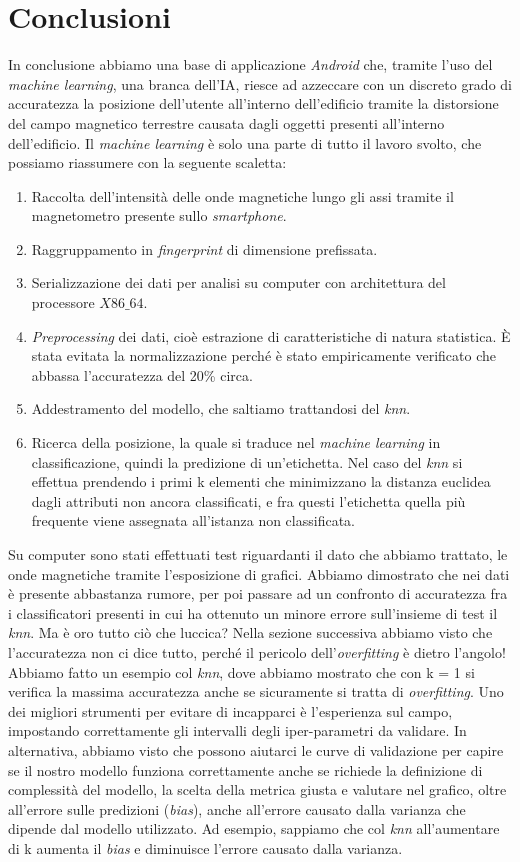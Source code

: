 \section{Conclusioni}
In conclusione abbiamo una base di applicazione \textit{Android} che, tramite l'uso del \textit{machine learning}, una branca dell'IA, riesce ad azzeccare con un discreto grado di accuratezza la posizione dell'utente all'interno dell'edificio tramite la distorsione del campo magnetico terrestre causata dagli oggetti presenti all'interno dell'edificio. Il \textit{machine learning} \`e solo una parte di tutto il lavoro svolto, che possiamo riassumere con la seguente scaletta:
\begin{enumerate}
	\item Raccolta dell'intensit\`a delle onde magnetiche lungo gli assi tramite il magnetometro presente sullo \textit{smartphone}.
	\item Raggruppamento in \textit{fingerprint} di dimensione prefissata.
	\item Serializzazione dei dati per analisi su computer con architettura del processore $X86\_64$.
	\item \textit{Preprocessing} dei dati, cio\`e  estrazione di caratteristiche di natura statistica. \`E stata evitata la normalizzazione perch\'e \`e stato empiricamente verificato che abbassa l'accuratezza del 20\% circa.
	\item Addestramento del modello, che saltiamo trattandosi del \textit{knn}.
	\item Ricerca della posizione, la quale si traduce nel \textit{machine learning} in classificazione, quindi la predizione di un'etichetta. Nel caso del \textit{knn} si effettua prendendo i primi k elementi che minimizzano la distanza euclidea dagli attributi non ancora classificati, e fra questi l'etichetta quella pi\`u frequente viene assegnata all'istanza non classificata.
\end{enumerate}
Su computer sono stati effettuati test riguardanti il dato che abbiamo trattato, le onde magnetiche tramite l'esposizione di grafici. Abbiamo dimostrato che nei dati \`e presente abbastanza rumore, per poi passare ad un confronto di accuratezza fra i classificatori presenti in cui ha ottenuto un minore errore sull'insieme di test il \textit{knn}. Ma \`e oro tutto ci\`o che luccica? Nella sezione successiva abbiamo visto che l'accuratezza non ci dice tutto, perch\'e il pericolo dell'\textit{overfitting} \`e dietro l'angolo! Abbiamo fatto un esempio col \textit{knn}, dove abbiamo mostrato che con k = 1 si verifica la massima accuratezza anche se sicuramente si tratta di \textit{overfitting}. Uno dei migliori strumenti per evitare di incapparci \`e l'esperienza sul campo, impostando correttamente gli intervalli degli iper-parametri da validare. In alternativa, abbiamo visto che possono aiutarci le curve di validazione per capire se il nostro modello funziona correttamente anche se richiede la definizione di complessit\`a del modello, la scelta della metrica giusta e valutare nel grafico, oltre all'errore sulle predizioni (\textit{bias}), anche all'errore causato dalla varianza che dipende dal modello utilizzato. Ad esempio, sappiamo che col \textit{knn} all'aumentare di k aumenta il \textit{bias} e diminuisce l'errore causato dalla varianza.